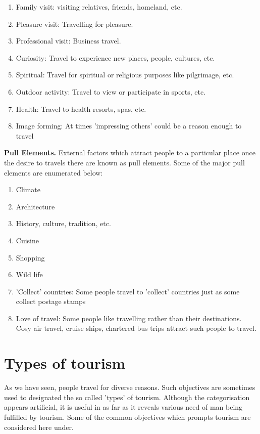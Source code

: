 \begin{enumerate}
  \item Family visit: visiting relatives, friends, homeland, etc.
  \item Pleasure visit: Travelling for pleasure.
  \item Professional visit: Business travel.
  \item Curiosity: Travel to experience new places, people, cultures, etc.
  \item Spiritual: Travel for spiritual or religious purposes like pilgrimage, etc.
  \item Outdoor activity: Travel to view or participate in sports, etc.
  \item Health: Travel to health resorts, spas, etc.
  \item Image forming: At times 'impressing others' could be a reason enough to travel
\end{enumerate}

\textbf{Pull Elements.} External factors which attract people to a particular place once the desire to travels there are known as pull elements. Some of the major pull elements are enumerated below:

\begin{enumerate}
  \item Climate
  \item Architecture
  \item History, culture, tradition, etc.
  \item Cuisine
  \item Shopping
  \item Wild life
  \item 'Collect' countries: Some people travel to 'collect' countries just as some collect postage stamps
  \item Love of travel: Some people like travelling rather than their destinations. Cosy air travel, cruise ships, chartered bus trips attract such people to travel.
\end{enumerate}

\section{Types of tourism} %
\label{sec:types}

As we have seen, people travel for diverse reasons. Such objectives are sometimes used to designated the so called 'types' of tourism. Although the categorisation appears artificial, it is useful in as far as it reveals various need of man being fulfilled by tourism. Some of the common objectives which prompts tourism are considered here under.

